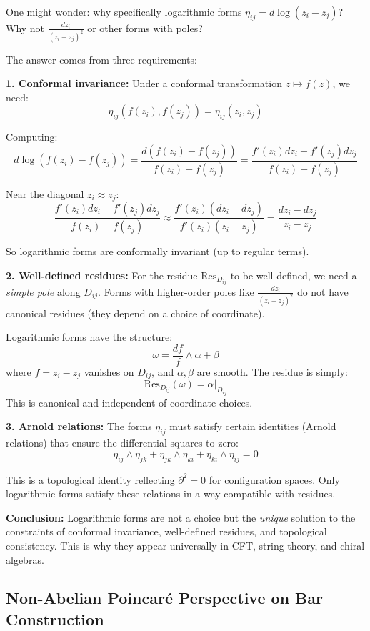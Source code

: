 \begin{remark}\label{rem:why-log-forced}
One might wonder: why specifically logarithmic forms $\eta_{ij} = d\log(z_i - z_j)$? Why not $\frac{dz_i}{(z_i-z_j)^2}$ or other forms with poles?

The answer comes from three requirements:

\textbf{1. Conformal invariance:} Under a conformal transformation $z \mapsto f(z)$, we need:
$$\eta_{ij}(f(z_i), f(z_j)) = \eta_{ij}(z_i, z_j)$$

Computing:
$$d\log(f(z_i) - f(z_j)) = \frac{d(f(z_i) - f(z_j))}{f(z_i) - f(z_j)} = \frac{f'(z_i)dz_i - f'(z_j)dz_j}{f(z_i) - f(z_j)}$$

Near the diagonal $z_i \approx z_j$:
$$\frac{f'(z_i)dz_i - f'(z_j)dz_j}{f(z_i) - f(z_j)} \approx \frac{f'(z_i)(dz_i - dz_j)}{f'(z_i)(z_i - z_j)} = \frac{dz_i - dz_j}{z_i - z_j}$$

So logarithmic forms are conformally invariant (up to regular terms).

\textbf{2. Well-defined residues:} For the residue $\text{Res}_{D_{ij}}$ to be well-defined, we need a \emph{simple pole} along $D_{ij}$. Forms with higher-order poles like $\frac{dz_i}{(z_i-z_j)^2}$ do not have canonical residues (they depend on a choice of coordinate).

Logarithmic forms have the structure:
$$\omega = \frac{df}{f} \wedge \alpha + \beta$$
where $f = z_i - z_j$ vanishes on $D_{ij}$, and $\alpha, \beta$ are smooth. The residue is simply:
$$\text{Res}_{D_{ij}}(\omega) = \alpha|_{D_{ij}}$$
This is canonical and independent of coordinate choices.

\textbf{3. Arnold relations:} The forms $\eta_{ij}$ must satisfy certain identities (Arnold relations) that ensure the differential squares to zero:
$$\eta_{ij} \wedge \eta_{jk} + \eta_{jk} \wedge \eta_{ki} + \eta_{ki} \wedge \eta_{ij} = 0$$

This is a topological identity reflecting $\partial^2 = 0$ for configuration spaces. Only logarithmic forms satisfy these relations in a way compatible with residues.

\textbf{Conclusion:} Logarithmic forms are not a choice but the \emph{unique} solution to the constraints of conformal invariance, well-defined residues, and topological consistency. This is why they appear universally in CFT, string theory, and chiral algebras.
\end{remark}

\subsection{Non-Abelian Poincaré Perspective on Bar Construction}

